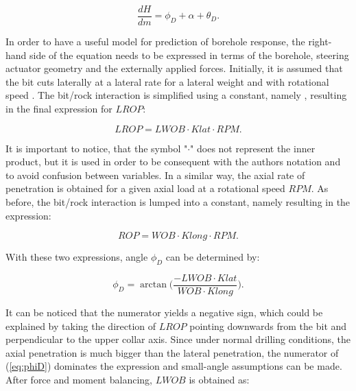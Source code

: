 \begin{equation}
	\frac{dH}{dm} = \phi_D + \alpha + \theta_D.
	\label{eq:tangent}
\end{equation}

In order to have a useful model for prediction of borehole response, the right-hand side of the equation needs to be expressed in terms of the borehole, steering actuator geometry and the externally applied forces. Initially, it is assumed that the bit cuts laterally at a lateral rate  for a lateral weight  and with rotational speed . The bit/rock interaction is simplified using a constant, namely , resulting in the final expression for $LROP$:

\begin{equation}
LROP = LWOB \cdot Klat \cdot RPM.
\end{equation}

It is important to notice, that the symbol "$\cdot$" does not represent the inner product, but it is used in order to be consequent with the authors notation and to avoid confusion between variables. In a similar way, the axial rate of penetration  is obtained for a given axial load  at a rotational speed $RPM$. As before, the bit/rock interaction is lumped into a constant, namely  resulting in the expression:

\begin{equation}
	ROP = WOB \cdot Klong \cdot RPM.
\end{equation}

With these two expressions, angle $\phi_D$ can be determined by:

\begin{equation}
	\phi_D = \arctan{\bigg( \frac{-LWOB \cdot Klat}{WOB \cdot Klong} \bigg)}
	\label{eq:phiD}.
\end{equation}

It can be noticed that the numerator yields a negative sign, which could be explained by taking the direction of $LROP$ pointing downwards from the bit and perpendicular to the upper collar axis. Since under normal drilling conditions, the axial penetration is much bigger than the lateral penetration, the numerator of (\ref{eq:phiD}) dominates the expression and small-angle assumptions can be made. After force and moment balancing, $LWOB$ is obtained as:

